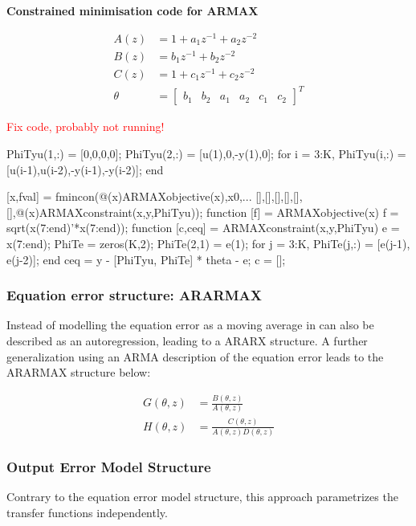 \documentclass[10pt,a4paper]{scrartcl}
\begin{document}
\begin{multicols*}{2}
\textbf{Constrained minimisation code for ARMAX}

\begin{align*}
A(z) &= 1+a_1z^{-1}+a_2z^{-2}\\
B(z)&= b_1z^{-1}+b_2z^{-2}\\
C(z)&=1+c_1z^{-1}+c_2z^{-2}\\
\theta&=\begin{bmatrix}
b_1&b_2&a_1&a_2&c_1&c_2
\end{bmatrix}^T
\end{align*}

\textcolor{red}{Fix code, probably not running!}

\begin{TPMatlab}
PhiTyu(1,:) = [0,0,0,0];
PhiTyu(2,:) = [u(1),0,-y(1),0];
for i = 3:K,
	PhiTyu(i,:) = [u(i-1),u(i-2),-y(i-1),-y(i-2)];
end

[x,fval] = fmincon(@(x)ARMAXobjective(x),x0,...
[],[],[],[],[],[],@(x)ARMAXconstraint(x,y,PhiTyu));
function [f] = ARMAXobjective(x) %
f = sqrt(x(7:end)'*x(7:end));
function [c,ceq] = ARMAXconstraint(x,y,PhiTyu)
e = x(7:end);
PhiTe = zeros(K,2);
PhiTe(2,1) = e(1);
for j = 3:K,
PhiTe(j,:) = [e(j-1), e(j-2)];
end
ceq = y - [PhiTyu, PhiTe] * theta - e; c = [];
\end{TPMatlab}

\subsubsection{Equation error structure: ARARMAX}

Instead of modelling the equation error as a moving average in can also be described as an autoregression, leading to a ARARX structure. A further generalization using an ARMA description of the equation error leads to the ARARMAX structure below:


\begin{align*}
G(\theta,z)&=\frac{B(\theta,z)}{A(\theta,z)}\\
H(\theta,z)&=\frac{C(\theta,z)}{A(\theta,z)D(\theta,z)}
\end{align*}

\subsubsection{Output Error Model Structure}

Contrary to the equation error model structure, this approach parametrizes the transfer functions independently.


\end{multicols*}
\end{document}
